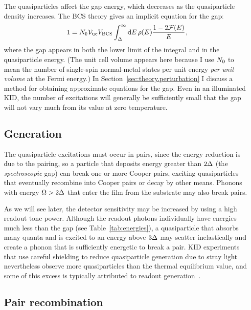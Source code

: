 The quasiparticles affect the gap energy, which decreases as the quasiparticle density increases.
The BCS theory gives an implicit equation for the gap:
\begin{equation}
1
  =
  N_0 \mathcal{V}_\mathrm{uc} V_\mathrm{BCS}
  \int_\Delta^\infty \dd{E}
  \rho(E) \frac{1 - 2 \mathcal{F}(E)}{E},
\end{equation}
where the gap appears in both the lower limit of the integral and in the quasiparticle energy.
(The unit cell volume appears here because I use $N_0$ to mean the number of single-spin normal-metal states per unit energy \textit{per unit volume} at the Fermi energy.)
In Section~\ref{sec:theory.perturbation} I discuss a method for obtaining approximate equations for the gap.
Even in an illuminated KID, the number of excitations will generally be sufficiently small that the gap will not vary much from its value at zero temperature.


\subsection{Generation}
\label{sec:theory.quasiparticle.generation}

The quasiparticle excitations must occur in pairs, since the energy reduction is due to the pairing, so a particle that deposits energy greater than $2 \Delta$ (the \textit{spectroscopic} gap) can break one or more Cooper pairs, exciting quasiparticles that eventually recombine into Cooper pairs or decay by other means.
Phonons with energy $\Omega > 2 \Delta$ that enter the film from the substrate may also break pairs.

As we will see later, the detector sensitivity may be increased by using a high readout tone power.
Although the readout photons individually have energies much less than the gap (see Table~\ref{tab:energies}), a quasiparticle that absorbs many quanta and is excited to an energy above $3 \Delta$ may scatter inelastically and create a phonon that is sufficiently energetic to break a pair.
KID experiments that use careful shielding to reduce quasiparticle generation due to stray light nevertheless observe more quasiparticles than the thermal equilibrium value, and some of this excess is typically attributed to readout generation~\autocite{deVisser2012APL,deVisser2014NatComm}.


\subsection{Pair recombination}
\label{sec:theory.quasiparticle.pair_recombination}

